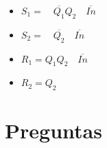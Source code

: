 \documentclass{article}
\begin{document}
    \begin{itemize}
    	\item {
    	$S_{1} =  \quad \overline{Q_{1}} Q_{2} \quad \overline{In}$
    	\begin{center}
    		\begin{karnaugh-map}[4][2][1][$Q_{1}Q_{2}$][$In$]
    		\end{karnaugh-map}
    	\end{center}	
    	}
    \item {
    	$S_{2} =  \quad \overline{Q_{2}} \quad \overline{In}$
    	\begin{center}
    		\begin{karnaugh-map}[4][2][1][$Q_{1}Q_{2}$][$In$]
    		\end{karnaugh-map}
    	\end{center}	
    }
\item {
	$R_{1} =  Q_{1} Q_{2} \quad \overline{In}$
	\begin{center}
		\begin{karnaugh-map}[4][2][1][$Q_{1}Q_{2}$][$In$]
		\end{karnaugh-map}
	\end{center}	
}
\item {
	$R_{2} =  Q_{2}$
	\begin{center}
		\begin{karnaugh-map}[4][2][1][$Q_{1}Q_{2}$][$In$]
		\end{karnaugh-map}
	\end{center}	
}
    
    \end{itemize}
    
     

    \section{Preguntas}
\end{document}
